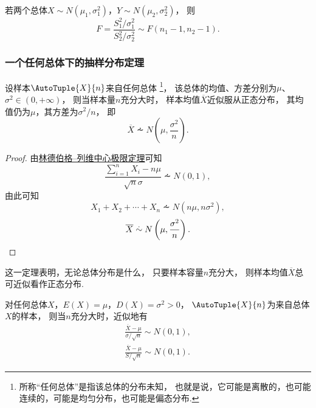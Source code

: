 \begin{theorem}
若两个总体\(X \sim N(\mu_1,\sigma_1^2)\)，\(Y \sim N(\mu_2,\sigma_2^2)\)，
则\begin{equation}
	F = \frac{S_1^2 / \sigma_1^2}{S_2^2 / \sigma_2^2} \sim F(n_1-1,n_2-1).
\end{equation}
\end{theorem}

\subsubsection{一个任何总体下的抽样分布定理}
\begin{theorem}
设样本\(\AutoTuple{X}{n}\)来自任何总体%
\footnote{所称“任何总体”是指该总体的分布未知，
也就是说，它可能是离散的，也可能连续的，可能是均匀分布，也可能是偏态分布.}，
该总体的均值、方差分别为\(\mu\)、\(\sigma^2\in(0,+\infty)\)，
则当样本量\(n\)充分大时，
样本均值\(\overline{X}\)近似服从正态分布，
其均值仍为\(\mu\)，其方差为\(\sigma^2/n\)，
即\begin{equation}
	\overline{X}
	\dotsim
	N\left(\mu,\frac{\sigma^2}{n}\right).
\end{equation}
\begin{proof}
由\hyperref[theorem:极限定理.林德伯格--列维中心极限定理]{林德伯格--列维中心极限定理}可知\[
	\frac{\sum_{i=1}^n X_i - n\mu}{\sqrt{n} \sigma} \dotsim N(0,1),
\]
由此可知\[
	X_1+X_2+\dotsb+X_n \dotsim N(n\mu,n\sigma^2),
\]\[
	\overline{X} \overset{.}{\sim} N\left(\mu,\frac{\sigma^2}{n}\right).
	\qedhere
\]
\end{proof}
\end{theorem}
这一定理表明，无论总体分布是什么，
只要样本容量\(n\)充分大，
则样本均值\(\overline{X}\)总可近似看作正态分布.

\begin{theorem}
对任何总体\(X\)，\(E(X)=\mu\)，\(D(X)=\sigma^2>0\)，
\(\AutoTuple{X}{n}\)为来自总体\(X\)的样本，
则当\(n\)充分大时，近似地有\begin{gather}
	\frac{\overline{X}-\mu}{\sigma/\sqrt{n}} \sim N(0,1), \\
	\frac{\overline{X}-\mu}{S/\sqrt{n}} \sim N(0,1).
\end{gather}
\end{theorem}
